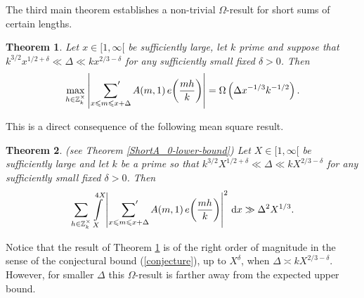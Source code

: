 \documentclass[a4paper,10pt,twoside]{amsart}
\newtheorem{theorem}{Theorem}[section]
\theoremstyle{definition}
\numberwithin{equation}{section}
\renewcommand\:{\colon}
\newcommand{\sump}{\mathop{{\sum}^{\raisebox{-3pt}{\makebox[0pt][l]{$'$}}}}}
\begin{document}

   
The third main theorem establishes a non-trivial $\Omega$-result for short sums of certain lengths. 

\begin{theorem}\label{Short-Omega}
Let $x\in[1,\infty[$ be sufficiently large, let $k$ prime and suppose that $k^{3/2}x^{1/2+\delta}\ll\Delta\ll kx^{2/3-\delta}$ for any sufficiently small fixed $\delta>0$. Then
\begin{align*}
\max_{h\in\mathbb Z_k^\times}\left|\sump_{x\leqslant m\leqslant x+\Delta}A(m,1)\,e\!\left(\frac{mh}k\right)\right|=\Omega\left(\Delta x^{-1/3}k^{-1/2}\right).
\end{align*}
\end{theorem}

\noindent This is a direct consequence of the following mean square result.

\begin{theorem}\label{Short-mean-square} (see Theorem \ref{ShortA_0-lower-bound})
Let $X\in[1,\infty[$ be sufficiently large and let $k$ be a prime so that $k^{3/2}X^{1/2+\delta}\ll\Delta\ll kX^{2/3-\delta}$ for any sufficiently small fixed $\delta>0$. Then 
\begin{align*}
\sum_{h\in\mathbb Z_k^\times}\int\limits_X^{4X}\left|\sump_{x\leqslant m\leqslant x+\Delta} A(m,1)\,e\!\left(\frac{mh}k\right)\right|^2\,\mathrm d x\gg\Delta^2X^{1/3}.
\end{align*}
\end{theorem}    
   
\noindent Notice that the result of Theorem \ref{Short-Omega} is of the right order of magnitude in the sense of the conjectural bound (\ref{conjecture}), up to $X^\delta$, when $\Delta\asymp kX^{2/3-\delta}$. However, for smaller $\Delta$ this $\Omega$-result is farther away from the expected upper bound. 

   
\end{document}
